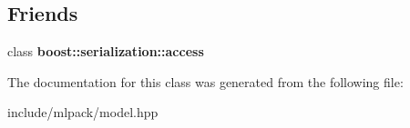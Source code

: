 \subsection*{Friends}
\begin{DoxyCompactItemize}
\item 
\hypertarget{classmlpack_1_1_model_ac98d07dd8f7b70e16ccb9a01abf56b9c}{
class {\bfseries boost::serialization::access}}
\label{classmlpack_1_1_model_ac98d07dd8f7b70e16ccb9a01abf56b9c}

\end{DoxyCompactItemize}


The documentation for this class was generated from the following file:\begin{DoxyCompactItemize}
\item 
include/mlpack/model.hpp\end{DoxyCompactItemize}
